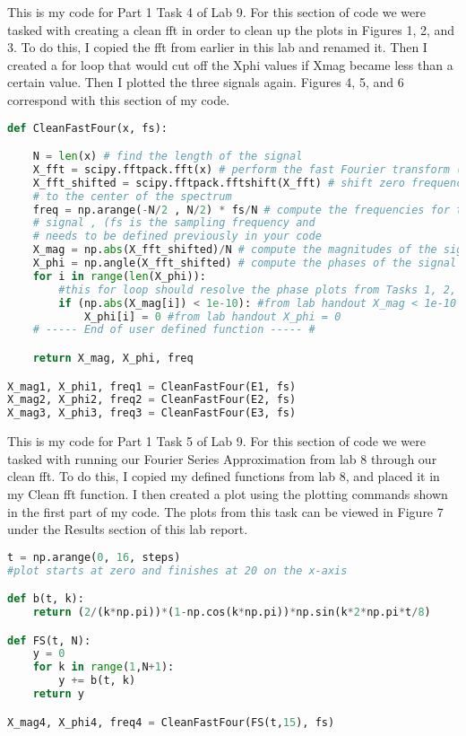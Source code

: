 \documentclass[12pt]{report}
\begin{document}
{This is my code for Part 1 Task 4 of Lab 9. For this section of code we were tasked with creating a clean fft in order to clean up the plots in Figures 1, 2, and 3. To do this, I copied the fft from earlier in this lab and renamed it. Then I created a for loop that would cut off the Xphi values if Xmag became less than a certain value. Then I plotted the three signals again. Figures 4, 5, and 6 correspond with this section of my code.}
\begin{lstlisting}[language=Python]
def CleanFastFour(x, fs):

    N = len(x) # find the length of the signal
    X_fft = scipy.fftpack.fft(x) # perform the fast Fourier transform (fft)
    X_fft_shifted = scipy.fftpack.fftshift(X_fft) # shift zero frequency components
    # to the center of the spectrum
    freq = np.arange(-N/2 , N/2) * fs/N # compute the frequencies for the output
    # signal , (fs is the sampling frequency and
    # needs to be defined previously in your code
    X_mag = np.abs(X_fft_shifted)/N # compute the magnitudes of the signal
    X_phi = np.angle(X_fft_shifted) # compute the phases of the signal
    for i in range(len(X_phi)): 
        #this for loop should resolve the phase plots from Tasks 1, 2, and 3
        if (np.abs(X_mag[i]) < 1e-10): #from lab handout X_mag < 1e-10
            X_phi[i] = 0 #from lab handout X_phi = 0
    # ----- End of user defined function ----- #

    return X_mag, X_phi, freq

X_mag1, X_phi1, freq1 = CleanFastFour(E1, fs)
X_mag2, X_phi2, freq2 = CleanFastFour(E2, fs)
X_mag3, X_phi3, freq3 = CleanFastFour(E3, fs) 
\end{lstlisting}

{This is my code for Part 1 Task 5 of Lab 9. For this section of code we were tasked with running our Fourier Series Approximation from lab 8 through our clean fft. To do this, I copied my defined functions from lab 8, and placed it in my Clean fft function. I then created a plot using the plotting commands shown in the first part of my code. The plots from this task can be viewed in Figure 7 under the Results section of this lab report.    }
\begin{lstlisting}[language=Python]
t = np.arange(0, 16, steps) 
#plot starts at zero and finishes at 20 on the x-axis

def b(t, k):
    return (2/(k*np.pi))*(1-np.cos(k*np.pi))*np.sin(k*2*np.pi*t/8)

def FS(t, N):
    y = 0
    for k in range(1,N+1):
        y += b(t, k)
    return y

X_mag4, X_phi4, freq4 = CleanFastFour(FS(t,15), fs)
\end{lstlisting}
\end{document}
